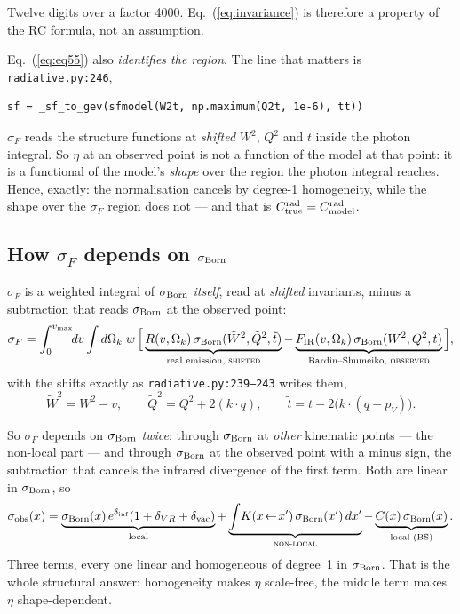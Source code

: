 \documentclass[11pt]{article}
\begin{document}
Twelve digits over a factor 4000. Eq.~(\ref{eq:invariance}) is therefore a property of the RC
formula, not an assumption.

Eq.~(\ref{eq:eq55}) also \emph{identifies the region}. The line that matters is
\texttt{radiative.py:246},
\begin{verbatim}
sf = _sf_to_gev(sfmodel(W2t, np.maximum(Q2t, 1e-6), tt))
\end{verbatim}
$\sigma_F$ reads the structure functions at \emph{shifted} $W^2$, $Q^2$ and $t$ inside the photon
integral. So $\eta$ at an observed point is not a function of the model at that point: it is a
functional of the model's \emph{shape} over the region the photon integral reaches. Hence, exactly:
the normalisation cancels by degree-1 homogeneity, while the shape over the $\sigma_F$ region does
not --- and that is $C^{\rm rad}_{\rm true}=C^{\rm rad}_{\rm model}$.

\subsection*{How \texorpdfstring{$\sigma_F$}{sigma F} depends on
\texorpdfstring{$\sigma_{\rm Born}$}{sigma Born}}

$\sigma_F$ is a weighted integral of $\sigma_{\rm Born}$ \emph{itself}, read at \emph{shifted}
invariants, minus a subtraction that reads $\sigma_{\rm Born}$ at the observed point:
\begin{equation}
\sigma_F=\int_0^{v_{\max}}\!\!dv\int d\Omega_k\;w\,
\Big[\underbrace{R(v,\Omega_k)\,\sigma_{\rm Born}(\tilde W^2,\tilde Q^2,\tilde t)}_{\text{real emission, \textsc{shifted}}}
-\underbrace{F_{\rm IR}(v,\Omega_k)\,\sigma_{\rm Born}(W^2,Q^2,t)}_{\text{Bardin--Shumeiko, \textsc{observed}}}\Big],
\end{equation}
with the shifts exactly as \texttt{radiative.py:239--243} writes them,
\begin{equation}
\tilde W^2=W^2-v,\qquad \tilde Q^2=Q^2+2(k\!\cdot\!q),\qquad \tilde t=t-2\big(k\!\cdot\!(q-p_V)\big).
\end{equation}

So $\sigma_F$ depends on $\sigma_{\rm Born}$ \emph{twice}: through $\sigma_{\rm Born}$ at
\emph{other} kinematic points --- the non-local part --- and through $\sigma_{\rm Born}$ at the
observed point with a minus sign, the subtraction that cancels the infrared divergence of the first
term. Both are linear in $\sigma_{\rm Born}$, so
\begin{equation}
\sigma_{\rm obs}(x)=\underbrace{\sigma_{\rm Born}(x)\,e^{\delta_{\rm inf}}(1+\delta_{VR}+\delta_{\rm vac})}_{\text{local}}
+\underbrace{\int\! K(x\!\leftarrow\!x')\,\sigma_{\rm Born}(x')\,dx'}_{\textsc{non-local}}
-\underbrace{C(x)\,\sigma_{\rm Born}(x)}_{\text{local (BS)}} .
\end{equation}
Three terms, every one linear and homogeneous of degree~1 in $\sigma_{\rm Born}$. That is the whole
structural answer: homogeneity makes $\eta$ scale-free, the middle term makes $\eta$ shape-dependent.
\end{document}
